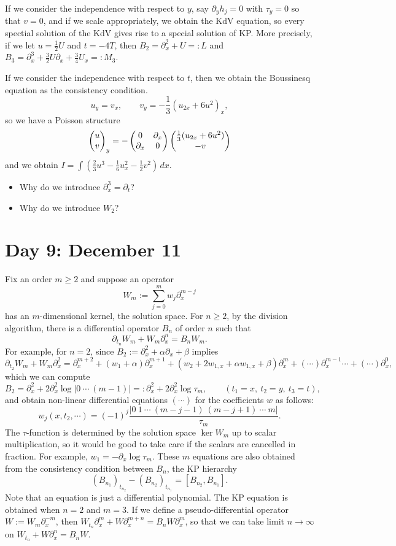 \documentclass{../../../small}
\begin{document}
If we consider the independence with respect to $y$, say $\partial_yh_j=0$ with $\tau_y=0$ so that $v=0$, and if we scale appropriately, we obtain the KdV equation, so every spectial solution of the KdV gives rise to a special solution of KP.
More precisely, if we let $u=\frac12U$ and $t=-4T$, then $B_2=\partial_x^2+U=:L$ and $B_3=\partial_x^3+\frac32U\partial_x+\frac34U_x=:M_3$.

If we consider the independence with respect to $t$, then we obtain the Boussinesq equation as the consistency condition.
\[u_y=v_x,\qquad v_y=-\frac13(u_{2x}+6u^2)_x,\]
so we have a Poisson structure
\[\begin{pmatrix}u\\v\end{pmatrix}_y=-\begin{pmatrix}0&\partial_x\\\partial_x&0\end{pmatrix}\begin{pmatrix}\frac13(u_{2x}+6u^2)\\-v\end{pmatrix}\]
and we obtain $I=\int(\frac23u^3-\frac16u_x^2-\frac12v^2)\,dx$.


\begin{itemize}
\item Why do we introduce $\partial_x^3=\partial_t$?
\item Why do we introduce $W_2$?
\end{itemize}

\newpage
\section{Day 9: December 11}

Fix an order $m\ge2$ and suppose an operator
\[W_m:=\sum_{j=0}^mw_j\partial_x^{m-j}\]
has an $m$-dimensional kernel, the solution space.
For $n\ge2$, by the division algorithm, there is a differential operator $B_n$ of order $n$ such that
\[\partial_{t_n}W_m+W_m\partial_x^n=B_nW_m.\]
For example, for $n=2$, since $B_2:=\partial_x^2+\alpha\partial_x+\beta$ implies
\[\partial_{t_2}W_m+W_m\partial_x^2=\partial_x^{m+2}+(w_1+\alpha)\partial_x^{m+1}+(w_2+2w_{1,x}+\alpha w_{1,x}+\beta)\partial_x^m+(\cdots)\partial_x^{m-1}\cdots+(\cdots)\partial_x^0,\]
which we can compute
\[B_2=\partial_x^2+2\partial_x^2\log|0\ \cdots\ (m-1)|=:\partial_x^2+2\partial_x^2\log\tau_m,\qquad(t_1=x,\ t_2=y,\ t_3=t),\]
and obtain non-linear differential equations $(\cdots)$ for the coefficients $w$ as follows:
\[w_j(x,t_2,\cdots)=(-1)^j\frac{|0\ 1\ \cdots\ (m-j-1)\ (m-j+1)\ \cdots\ m|}{\tau_m}.\]
The $\tau$-function is determined by the solution space $\ker W_m$ up to scalar multiplication, so it would be good to take care if the scalars are cancelled in fraction.
For example, $w_1=-\partial_x\log\tau_m$.
These $m$ equations are also obtained from the consistency condition between $B_n$, the KP hierarchy
\[(B_{n_1})_{t_{n_2}}-(B_{n_2})_{t_{n_1}}=[B_{n_2},B_{n_1}].\]
Note that an equation is just a differential polynomial.
The KP equation is obtained when $n=2$ and $m=3$.
If we define a pseudo-differential operator $W:=W_m\partial_x^{-m}$, then $W_{t_n}\partial_x^m+W\partial_x^{m+n}=B_nW\partial_x^m$, so that we can take limit $n\to\infty$ on $W_{t_n}+W\partial_x^n=B_nW$.
\end{document}
